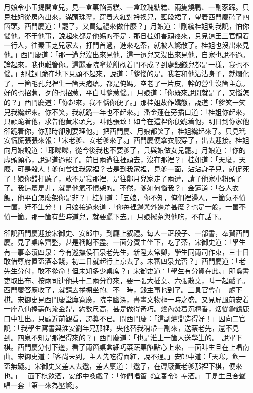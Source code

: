 月娘令小玉揭開盒兒，見一盒菓餡壽糕、一盒玫瑰糖糕、兩隻燒鴨、一副豕蹄。只見桂姐從房內出來，滿頭珠翠，穿着大紅對衿襖兒，藍段裙子，望着西門慶磕了四箇頭。西門慶道：「罷了，又買這禮來做什麼？」月娘道：「剛纔桂姐對我說，怕你惱他。不干他事，說起來都是他媽的不是：那日桂姐害頭疼來，只見這王三官領着一行人，往秦玉芝兒家去，打門首過，進來吃茶，就被人驚散了。桂姐也沒出來見他。」西門慶道：「那一遭兒沒出來見他，這一遭兒又沒出來見他，自家也說不過。論起來，我也難管你。這麗春院拿燒餅砌着門不成？到處銀錢兒都是一樣，我也不惱。」{}那桂姐跪在地下只顧不起來，說道：「爹惱的是。我若和他沾沾身子，就爛化了，一箇毛孔兒裡生一箇天疱瘡。都是俺媽，空老了一片皮，幹的營生沒箇主意。好的也招惹，歹的也招惹，平白叫爹惹惱。」月娘道：「你既來說開就是了，又惱怎的？」西門慶道：「你起來，我不惱你便了。」{}那桂姐故作嬌態，說道：「爹笑一笑兒我纔起來。你不笑，我就跪一年也不起來。」潘金蓮在旁插口道：「桂姐你起來，只顧跪着他，求告他黃米頭兒，叫他張致！如今在這裡你便跪着他，明日到你家他卻跪着你，{}你那時卻別要理他。」{}把西門慶、月娘都笑了，桂姐纔起來了。只見玳安慌慌張張來報：「宋老爹、安老爹來了。」西門慶便拿衣服穿了，出去迎接。桂姐向月娘說道：「耶嚛嚛，從今後我也不要爹了，只與娘做女兒罷。」月娘道：「你的虛頭願心，說過道過罷了。前日兩遭往裡頭去，沒在那裡？」桂姐道：「天麼，天麼，可是殺人！爹何曾往我家裡？{}若是到我家裡，見爹一面，沾沾身子兒，就促死了！娘你錯打聽了，敢不是我那裡，是往鄭月兒家走了兩遭，請了他家小粉頭子了。我這篇是非，就是他氣不憤架的。不然，爹如何惱我？」{}金蓮道：「各人衣飯，他平白怎麼架你是非？」{}桂姐道：「五娘，你不知，俺們裡邊人，一箇氣不憤一箇，好不生分！」月娘接過來道：「你每裡邊與外邊差甚麼？也是一般，一箇不憤一箇。那一箇有些時道兒，就要躧下去。」{}月娘擺茶與他吃，不在話下。

卻說西門慶迎接宋御史、安郎中，到廳上叙禮。每人一疋段子、一部書，奉賀西門慶。見了桌席齊整，甚是稱謝不盡。一面分賓主坐下，吃了茶，宋御史道：「學生有一事奉瀆四泉：今有巡撫侯石泉老先生，新陞太常卿，學生同兩司作東，三十日敢借尊府置盃酒奉餞，初二日就起行上京去了。未審四泉允否？」西門慶道：「老先生分付，敢不從命！但未知多少桌席？」宋御史道：「學生有分資在此。」即喚書吏取出布、按兩司連他共十二兩分資來，要一張大插桌、六張散桌，叫一起戲子。西門慶答應收了，就請去捲棚坐的。不一時，錢主事也到了。三員官會在一處下棋。宋御史見西門慶堂廡寬廣，院宇幽深，書畫文物極一時之盛。又見屏風前安着一座八仙捧壽的流金鼎，約數尺高，甚是做得奇巧。爐內焚着沉檀香，烟從龜鶴鹿口中吐出。只顧近前觀看，誇獎不已。{}問西門慶：「這副爐鼎造得好！」因向二官說：「我學生寫書與淮安劉年兄那裡，央他替我稍帶一副來，送蔡老先，還不見到。四泉不知是那裡得來的？」西門慶道：「也是淮上一箇人送學生的。」說畢下棋。西門慶分付下邊，看了兩箇桌盒細巧菜蔬菓餡點心上來，一面叫生旦在上唱南曲。宋御史道：「客尚未到，主人先吃得面紅，說不通。」安郎中道：「天寒，飲一盃無礙。」宋御史又差人去邀，差人稟道：「邀了，在磚廠黃老爹那裡下棋，便來也。」一面下棋飲酒，安郎中喚戲子：「你們唱箇《宜春令》奉酒。」于是生旦合聲唱一套「第一來為壓驚」。


